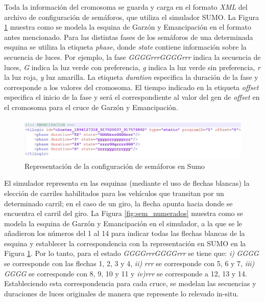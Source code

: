 Toda la información del cromosoma se guarda y carga en el formato \emph{XML} del archivo de configuración de semáforos, que utiliza el simulador SUMO. La Figura \ref{fig:rep_sumo} muestra como se modela la esquina de Garzón y Emancipación en el formato antes mencionado. Para las distintas fases de los semáforos de una determinada esquina se utiliza la etiqueta \emph{phase}, donde \emph{state} contiene información sobre la secuencia de luces. Por ejemplo, la fase \emph{GGGGrrrGGGGrrr} indica la secuencia de luces, \emph{G} indica la luz verde con preferencia, \emph{g} indica la luz verde sin preferencia, \emph{r} la luz roja, \emph{y} luz amarilla. La etiqueta \emph{duration} especifica la duración de la fase y corresponde a los valores del cromosoma. El tiempo indicado en la etiqueta \emph{offset} especifica el inicio de la fase y será el correspondiente al valor del gen de \emph{offset} en el cromosoma para el cruce de Garzón y Emancipación.


\begin{figure}[ht]
	\centering
	\includegraphics[width=\linewidth]{Figures/rep_sumo}
	\caption{Representación de la configuración de semáforos en Sumo}
	\label{fig:rep_sumo}
\end{figure}

\newpage

El simulador representa en las esquinas (mediante el uso de flechas blancas) la elección de carriles habilitados para los vehículos que transitan por un determinado carril; en el caso de un giro, la flecha apunta hacia donde se encuentra el carril del giro. La Figura \ref{fig:sem_numerados} muestra como se modela la esquina de Garzón y Emancipación en el simulador, a la que se le añadieron los números del 1 al 14 para indicar todas las flechas blancas de la esquina y establecer la correspondencia con la representación en SUMO en la Figura \ref{fig:rep_sumo}. Por lo tanto, para el estado \emph{GGGGrrrGGGGrrr} se tiene que: \textit{i)} \emph{GGGG} se corresponde con las flechas 1, 2, 3 y 4, \textit{ii)} \emph{rrr} se corresponde con 5, 6 y 7, \textit{iii)} \emph{GGGG} se corresponde con 8, 9, 10 y 11 y \textit{iv)}\emph{rrr} se corresponde a 12, 13 y 14. Estableciendo esta correspondencia para cada cruce, se modelan las secuencias y duraciones de luces originales de manera que represente lo relevado in-situ.

